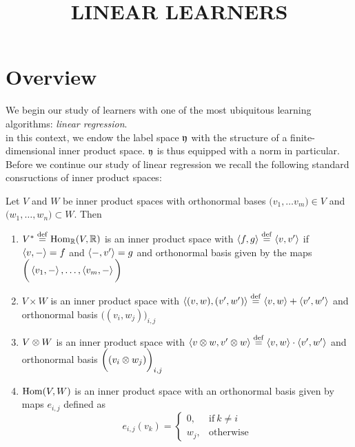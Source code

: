 


\title{LINEAR LEARNERS}

\maketitle	


\noindent\hrulefill
\tableofcontents
\noindent\hrulefill

\label{section-phantom}

\section{Overview}

We begin our study of learners with one of the most ubiquitous learning algorithms: \emph{linear regression}.\\ in this context, we endow the  label space $\mathfrak{y}$ with the structure of a finite-dimensional inner product space. $\mathfrak{y}$ is thus equipped with a norm in particular. Before we continue our study of linear regression we recall the following standard consructions of inner product spaces:

\begin{lemma}\label{lem:innerproducts}
Let $V$ and $W$ be inner product spaces with orthonormal bases $\big(v_1,\ldots v_m\big) \in V$ and $\big(w_1,\ldots , w_n\big) \subset W$. Then
\begin{enumerate}
\item $V^\ast \stackrel{\operatorname{def}}{=} \operatorname{Hom}_{\mathbb{R}}(V,\mathbb{R})$ is an inner product space with $\left\langle f,g\right\rangle\stackrel{\operatorname{def}}{=} \left\langle v,v'\right\rangle$ if $\left\langle v,-\right\rangle=f$ and  $\left\langle -,v'\right\rangle=g$
and orthonormal basis given by the maps $\bigg( \left\langle v_1,-\right\rangle, \ldots, \left\langle v_m,-\right\rangle \bigg)$
\item $V\times W$ is an inner product space with $\left\langle (v,w),(v',w')\right\rangle\stackrel{\operatorname{def}}{=} \left\langle v,w\right\rangle+\left\langle v',w'\right\rangle$ and orthonormal basis $\bigg((v_i,w_j)\bigg)_{i,j}$
\item $V\otimes W$ is an inner product space with $\left\langle v\otimes w,v'\otimes w\right\rangle\stackrel{\operatorname{def}}{=} \left\langle v,w\right\rangle\cdot \left\langle v',w'\right\rangle$ and orthonormal basis $\bigg((v_i\otimes w_j)\bigg)_{i,j}$	
\item $\operatorname{Hom}(V,W)$ is an inner product space with an orthonormal basis given by maps $e_{i,j}$ defined as
\begin{equation}
e_{i,j}(v_k)=
\begin{cases}
0, & \text{if}\ k \neq i  \\
w_j, & \text{otherwise}
\end{cases}
\end{equation}
\end{enumerate}
\end{lemma}


